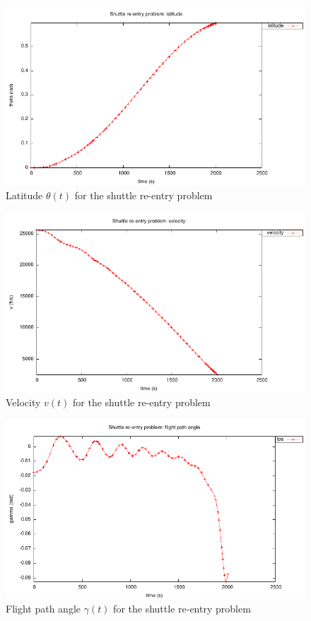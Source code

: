 \documentclass[a4paper,11pt]{report}    %
\begin{document}
\begin{figure}
  \centering 
  \includegraphics{../examples/shutt/shutt_lat}
  \caption{Latitude $\theta(t)$ for the shuttle re-entry problem}
 \label{fig:shutt_lat}
\end{figure}

\begin{figure}
  \centering 
  \includegraphics{../examples/shutt/shutt_vel}
  \caption{Velocity $v(t)$ for the shuttle re-entry problem}
 \label{fig:shutt_vel}
\end{figure}

\begin{figure}
  \centering 
  \includegraphics{../examples/shutt/shutt_fpa}
  \caption{Flight path angle $\gamma(t)$ for the shuttle re-entry problem}
 \label{fig:shutt_fpa}
\end{figure}
\end{document}
